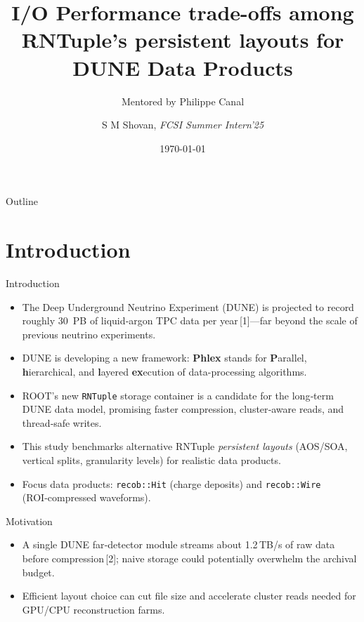 \documentclass[aspectratio=169]{beamer}
\title{I/O Performance trade-offs among RNTuple’s persistent layouts for DUNE Data Products}
\subtitle{Mentored by Philippe Canal}
\author{S M Shovan, \textit{FCSI Summer Intern'25}}
\institute{Fermi National Accelerator Laboratory}
\date{\today}
\begin{document}
\maketitle


\begin{frame}{Outline}
\tableofcontents
\end{frame}

\section{Introduction}

\begin{frame}{Introduction}
  \begin{itemize}
    \item The Deep Underground Neutrino Experiment (DUNE) is projected to record roughly 30~PB of liquid‑argon TPC data per year\,[1]—far beyond the scale of previous neutrino experiments.
    \item DUNE is developing a new framework: \textbf{Phlex} stands for \textbf{P}arallel, \textbf{h}ierarchical, and \textbf{l}ayered \textbf{ex}ecution of data-processing algorithms.
    \item ROOT’s new \texttt{RNTuple} storage container is a candidate for the long‑term DUNE data model, promising faster compression, cluster‑aware reads, and thread‑safe writes.
    \item This study benchmarks alternative RNTuple \emph{persistent layouts} (AOS/SOA, vertical splits, granularity levels) for realistic data products.
    \item Focus data products: \texttt{recob::Hit} (charge deposits) and \texttt{recob::Wire} (ROI‑compressed waveforms).
  \end{itemize}
\end{frame}

\begin{frame}{Motivation} 
  \begin{itemize}
    \item A single DUNE far‑detector module streams about 1.2\,TB/s of raw data before compression\,[2]; naive storage could potentially overwhelm the archival budget.

    \vspace{2em}

    \item Efficient layout choice can cut file size and accelerate cluster reads needed for GPU/CPU reconstruction farms.
  \end{itemize}
\end{frame}
\end{document}
